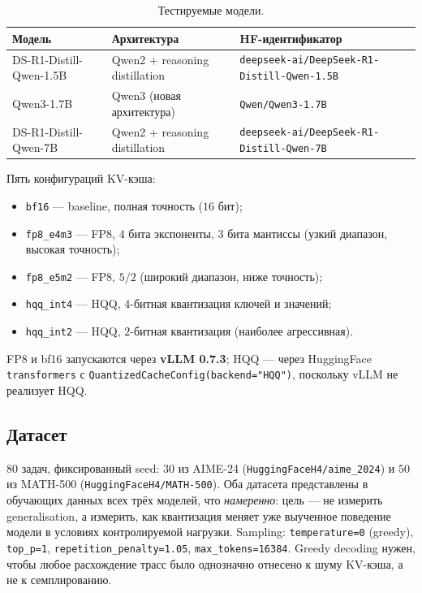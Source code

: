 \documentclass[11pt, a4paper]{article}
\newcommand{\code}[1]{\texttt{#1}}
\begin{document}
\begin{table}[H]
\centering
\small
\begin{tabular}{lll}
\toprule
\textbf{Модель} & \textbf{Архитектура} & \textbf{HF-идентификатор} \\
\midrule
DS-R1-Distill-Qwen-1.5B & Qwen2 + reasoning distillation & \code{deepseek-ai/DeepSeek-R1-Distill-Qwen-1.5B} \\
Qwen3-1.7B              & Qwen3 (новая архитектура)       & \code{Qwen/Qwen3-1.7B} \\
DS-R1-Distill-Qwen-7B   & Qwen2 + reasoning distillation & \code{deepseek-ai/DeepSeek-R1-Distill-Qwen-7B} \\
\bottomrule
\end{tabular}
\caption{Тестируемые модели.}
\label{tab:models}
\end{table}

\noindent Пять конфигураций KV-кэша:
\begin{itemize}[leftmargin=*]
\item \code{bf16} — baseline, полная точность ($16$ бит);
\item \code{fp8\_e4m3} — FP8, $4$ бита экспоненты, $3$ бита мантиссы (узкий диапазон, высокая точность);
\item \code{fp8\_e5m2} — FP8, $5/2$ (широкий диапазон, ниже точность);
\item \code{hqq\_int4} — HQQ, $4$-битная квантизация ключей и значений;
\item \code{hqq\_int2} — HQQ, $2$-битная квантизация (наиболее агрессивная).
\end{itemize}
FP8 и bf16 запускаются через \textbf{vLLM 0.7.3}; HQQ — через
HuggingFace \code{transformers} с \code{QuantizedCacheConfig(backend="HQQ")},
поскольку vLLM не реализует HQQ.

\subsection{Датасет}

$80$ задач, фиксированный seed: $30$ из AIME-24 (\code{HuggingFaceH4/aime\_2024})
и $50$ из MATH-500 (\code{HuggingFaceH4/MATH-500}). Оба датасета представлены в
обучающих данных всех трёх моделей, что \emph{намеренно}: цель — не измерить
generalisation, а измерить, как квантизация меняет уже выученное поведение
модели в условиях контролируемой нагрузки.
Sampling: \code{temperature=0} (greedy), \code{top\_p=1},
\code{repetition\_penalty=1.05}, \code{max\_tokens=16384}. Greedy
decoding нужен, чтобы любое расхождение трасс было однозначно
отнесено к шуму KV-кэша, а не к семплированию.
\end{document}
